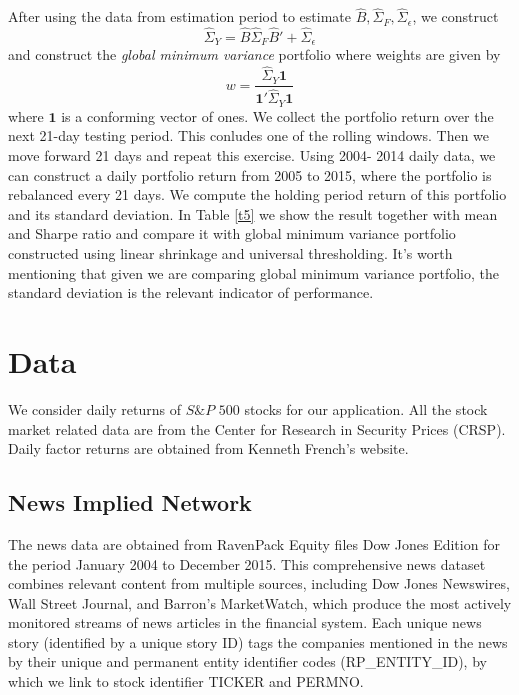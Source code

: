 After using the data from estimation period to estimate \(\hat{B} ,\hat{\Sigma}_{F}, \hat{\Sigma}_{\epsilon}\), we construct 
\begin{equation*}
    \hat{\Sigma}_{Y} = \hat{B} \hat{\Sigma}_{F} \hat{B}' + \hat{\Sigma}_{\epsilon} 
\end{equation*}
and construct the \textit{global minimum variance} portfolio where weights are given by 
\begin{equation*}
    w = \frac{\hat{\Sigma}_{Y} \mathbf{1}}{\mathbf{1}' \hat{\Sigma}_{Y} \mathbf{1}}
\end{equation*}
where \(\mathbf{1}\) is a conforming vector of ones. We collect the portfolio return over the next 21-day testing period. This conludes one of the rolling windows. Then we move forward 21 days and repeat this exercise. Using 2004- 2014 daily data, we can construct a daily portfolio return from 2005 to 2015, where the portfolio is rebalanced every 21 days. We compute the holding period return of this portfolio and its standard deviation. In Table \ref{t5} we show the result together with mean and Sharpe ratio and compare it with global minimum variance portfolio constructed using linear shrinkage and universal thresholding. It's worth mentioning that given we are comparing global minimum variance portfolio, the standard deviation is the relevant indicator of performance.  



\section{Data}
We consider daily returns of $S\& P$ $500$ stocks for our application. All the stock market related data are from the Center for Research in Security Prices (CRSP). Daily factor returns are obtained from Kenneth French’s website.
\subsection{News Implied Network}
The news data are obtained from RavenPack Equity files Dow Jones Edition for the period January 2004 to December 2015. This comprehensive news dataset combines relevant content from multiple sources, including Dow Jones Newswires, Wall Street Journal, and Barron's MarketWatch, which produce the most actively monitored streams of news articles in the financial system. Each unique news story (identified by a unique story ID) tags the companies mentioned in the news by their unique and permanent entity identifier codes (RP\_ENTITY\_ID),  by which we link to stock identifier TICKER and PERMNO.

